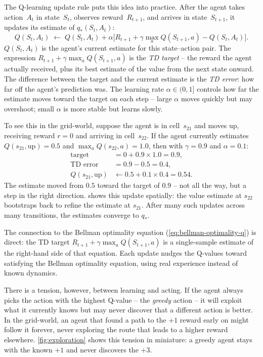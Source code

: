 \smallskip
The Q-learning update rule puts this idea into practice. After
the agent takes action~$A_t$ in state~$S_t$, observes
reward~$R_{t+1}$, and arrives in state~$S_{t+1}$, it updates
its estimate of $q_*(S_t, A_t)$:
%
\begin{equation}
\label{eq:q-learning}
Q(S_t, A_t) \;\leftarrow\; Q(S_t, A_t)
  + \alpha \Big[R_{t+1} + \gamma \max_{a} Q(S_{t+1}, a)
  - Q(S_t, A_t)\Big].
\end{equation}
%
$Q(S_t, A_t)$ is the agent's current estimate for this
state--action pair. The expression
$R_{t+1} + \gamma \max_a Q(S_{t+1}, a)$ is the \emph{TD
target} -- the reward the agent actually received, plus its best
estimate of the value from the next state onward. The difference
between the target and the current estimate is the \emph{TD
error}: how far off the agent's prediction was. The learning rate
$\alpha \in (0, 1]$ controls how far the estimate moves toward
the target on each step -- large $\alpha$ moves quickly but may
overshoot; small $\alpha$ is more stable but learns slowly.

\smallskip
To see this in the grid-world, suppose the agent is in
cell~$s_{21}$ and moves up, receiving reward $r = 0$ and
arriving in cell~$s_{22}$. If the agent currently estimates
$Q(s_{21}, \text{up}) = 0.5$ and $\max_a Q(s_{22}, a) = 1.0$,
then with $\gamma = 0.9$ and $\alpha = 0.1$:
%
\begin{align*}
\text{target} &= 0 + 0.9 \times 1.0 = 0.9, \\
\text{TD error} &= 0.9 - 0.5 = 0.4, \\
Q(s_{21}, \text{up}) &\leftarrow 0.5 + 0.1 \times 0.4 = 0.54.
\end{align*}
%
The estimate moved from $0.5$ toward the target of $0.9$ -- not
all the way, but a step in the right direction.
 shows this update spatially: the value
estimate at $s_{22}$ bootstraps back to refine the estimate at
$s_{21}$. After many such updates across many transitions, the
estimates converge to $q_*$.



\smallskip
The connection to the Bellman optimality equation
(\cref{eq:bellman-optimality-q}) is direct: the TD target
$R_{t+1} + \gamma \max_a Q(S_{t+1}, a)$ is a single-sample
estimate of the right-hand side of that equation. Each update
nudges the Q-values toward satisfying the Bellman optimality
equation, using real experience instead of known dynamics.

\smallskip
There is a tension, however, between learning and acting. If the
agent always picks the action with the highest Q-value -- the
\emph{greedy} action -- it will exploit what it currently knows
but may never discover that a different action is better. In the
grid-world, an agent that found a path to the $+1$ reward early
on might follow it forever, never exploring the route that leads
to a higher reward elsewhere. \cref{fig:exploration} shows this
tension in miniature: a greedy agent stays with the known $+1$
and never discovers the $+3$.

